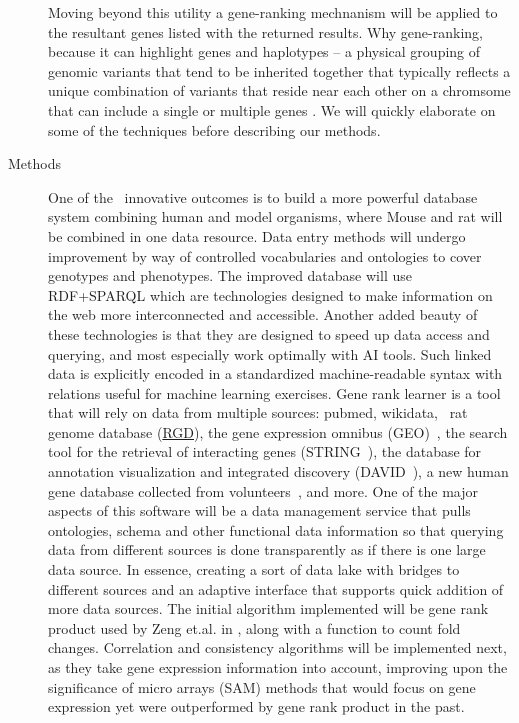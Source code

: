 \begin{description}
Moving beyond this utility a gene-ranking mechnanism will be applied to the resultant genes listed with the returned results.
Why gene-ranking, because it can highlight genes and haplotypes -- a physical grouping of genomic variants that tend to be inherited together that typically reflects a unique combination of variants that reside near each other on a chromsome that can include a single or multiple genes \cite{NHGRI:Haplotype}.
We will quickly elaborate on some of the techniques before describing our methods.
	\item[Methods] One of the \GN\ innovative outcomes is to build a more powerful database system combining human and model organisms, where Mouse and rat will be combined in one data resource.
Data entry methods will undergo improvement by way of controlled vocabularies and ontologies to cover genotypes and phenotypes.
The improved database will use RDF+SPARQL which are technologies designed to make information on the web more interconnected and accessible.
Another added beauty of these technologies is that they are designed to speed up data access and querying, and most especially work optimally with AI tools.
Such linked data is explicitly encoded in a standardized machine-readable syntax with relations useful for machine learning exercises\cite{toh2019}.
Gene rank learner is a tool that will rely on data from multiple sources: pubmed, wikidata, \GN\, rat genome database (\href{http://rgd.mcw.edu}{RGD}), the gene expression omnibus (GEO)~\cite{NCBIGeo}, the search tool for the retrieval of interacting genes (STRING~\cite{STRING}), the database for annotation visualization and integrated discovery (DAVID~\cite{DAVID}), a new human gene database collected from volunteers~\cite{henderson2020}, and more.
One of the major aspects of this software will be a data management service that pulls ontologies, schema and other functional data information so that querying data from different sources is done transparently as if there is one large data source. 
In essence, creating a sort of data lake with bridges to different sources and an adaptive interface that supports quick addition of more data sources.
The initial algorithm implemented will be gene rank product used by Zeng et.al. in \cite{zeng2016discovering}, along with a function to count fold changes.
Correlation and consistency algorithms will be implemented next, as they take gene expression information into account, improving upon the significance of micro arrays (SAM) methods that would focus on gene expression yet were outperformed by gene rank product in the past.

\end{description}
